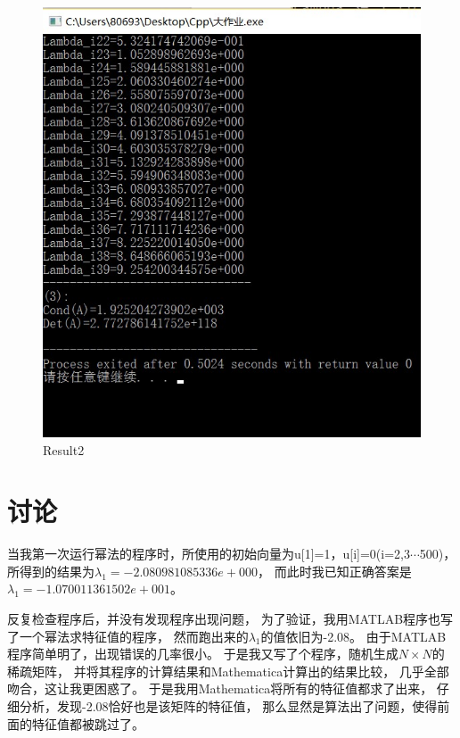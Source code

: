 \begin{figure}[h]
\small
\centering
\includegraphics[width=12cm]{2.jpg}
\caption{Result2} \label{fig:2}
\end{figure}

\chapter{讨论}
当我第一次运行幂法的程序时，所使用的初始向量为u[1]=1，u[i]=0(i=2,3$\cdots$500)，
所得到的结果为$\lambda_1=-2.080981085336e+000$，
而此时我已知正确答案是$\lambda_1=-1.070011361502e+001$。

反复检查程序后，并没有发现程序出现问题，
为了验证，我用MATLAB程序也写了一个幂法求特征值的程序，
然而跑出来的$\lambda_1$的值依旧为-2.08。
由于MATLAB程序简单明了，出现错误的几率很小。
于是我又写了个程序，随机生成$N\times N$的稀疏矩阵，
并将其程序的计算结果和Mathematica计算出的结果比较，
几乎全部吻合，这让我更困惑了。
于是我用Mathematica将所有的特征值都求了出来，
仔细分析，发现-2.08恰好也是该矩阵的特征值，
那么显然是算法出了问题，使得前面的特征值都被跳过了。

